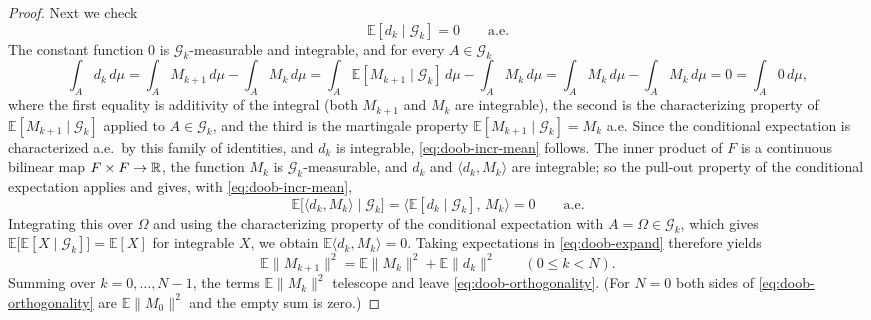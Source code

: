 \begin{proof}
Next we check
\begin{equation}\label{eq:doob-incr-mean}
  \mathbb E[d_k\mid\mathcal G_k]=0\qquad\text{a.e.}
\end{equation}
The constant function $0$ is $\mathcal G_k$-measurable and integrable, and for
every $A\in\mathcal G_k$
\[
  \int_Ad_k\,d\mu=\int_AM_{k+1}\,d\mu-\int_AM_k\,d\mu
   =\int_A\mathbb E[M_{k+1}\mid\mathcal G_k]\,d\mu-\int_AM_k\,d\mu
   =\int_AM_k\,d\mu-\int_AM_k\,d\mu=0=\int_A0\,d\mu,
\]
where the first equality is additivity of the integral (both $M_{k+1}$ and $M_k$
are integrable), the second is the characterizing property of
$\mathbb E[M_{k+1}\mid\mathcal G_k]$ applied to $A\in\mathcal G_k$, and the third
is the martingale property
$\mathbb E[M_{k+1}\mid\mathcal G_k]=M_k$ a.e. Since the conditional expectation
is characterized a.e.\ by this family of identities, and $d_k$ is integrable,
\eqref{eq:doob-incr-mean} follows.
The inner product of $F$ is a continuous bilinear map $F\times F\to\mathbb{R}$, the
function $M_k$ is $\mathcal G_k$-measurable, and $d_k$ and
$\langle d_k,M_k\rangle$ are integrable; so the pull-out property of the
conditional expectation applies and gives, with \eqref{eq:doob-incr-mean},
\[
  \mathbb E\bigl[\langle d_k,M_k\rangle\mid\mathcal G_k\bigr]
    =\bigl\langle\mathbb E[d_k\mid\mathcal G_k],\,M_k\bigr\rangle=0
  \qquad\text{a.e.}
\]
Integrating this over $\Omega$ and using the characterizing property of the
conditional expectation with $A=\Omega\in\mathcal G_k$, which gives
$\mathbb E\bigl[\mathbb E[X\mid\mathcal G_k]\bigr]=\mathbb E[X]$ for integrable
$X$, we obtain $\mathbb E\langle d_k,M_k\rangle=0$. Taking expectations in
\eqref{eq:doob-expand} therefore yields
\[
  \mathbb E\|M_{k+1}\|^2=\mathbb E\|M_k\|^2+\mathbb E\|d_k\|^2
  \qquad(0\le k<N).
\]
Summing over $k=0,\dots,N-1$, the terms $\mathbb E\|M_k\|^2$ telescope and
leave \eqref{eq:doob-orthogonality}. (For $N=0$ both sides of
\eqref{eq:doob-orthogonality} are $\mathbb E\|M_0\|^2$ and the empty sum is
zero.)
\end{proof}
